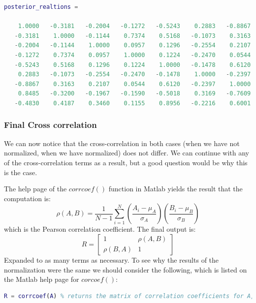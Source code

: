 \documentclass[12pt, a4paper]{article}
\begin{document}
\begin{lstlisting}[language=Matlab, label=lst:posterior, caption=The cross correlation output after normalization.]
posterior_realtions =

    1.0000   -0.3181   -0.2004   -0.1272   -0.5243    0.2883   -0.8867    0.8485   -0.4830
   -0.3181    1.0000   -0.1144    0.7374    0.5168   -0.1073    0.3163   -0.3200    0.4187
   -0.2004   -0.1144    1.0000    0.0957    0.1296   -0.2554    0.2107   -0.1967    0.3460
   -0.1272    0.7374    0.0957    1.0000    0.1224   -0.2470    0.0544   -0.1590    0.1155
   -0.5243    0.5168    0.1296    0.1224    1.0000   -0.1478    0.6120   -0.5018    0.8956
    0.2883   -0.1073   -0.2554   -0.2470   -0.1478    1.0000   -0.2397    0.3169   -0.2216
   -0.8867    0.3163    0.2107    0.0544    0.6120   -0.2397    1.0000   -0.7609    0.6001
    0.8485   -0.3200   -0.1967   -0.1590   -0.5018    0.3169   -0.7609    1.0000   -0.4549
   -0.4830    0.4187    0.3460    0.1155    0.8956   -0.2216    0.6001   -0.4549    1.0000    
\end{lstlisting}

\subsubsection{Final Cross correlation}

We can now notice that the cross-correlation in both cases (when we have not normalized, when we have normalized) does not differ. We can continue with any of the cross-correlation terms as a result, but a good question would be why this is the case.
\newline

The help page of the $corrcoef()$ function in Matlab yields the result that the computation is:
\[
\rho(A,B) = \frac{1}{N-1}\sum_{i=1}^{N}{\left(\frac{A_i-\mu_A}{\sigma_A}\right)\left(\frac{B_i-\mu_B}{\sigma_B}\right)}
\]
which is the Pearson correlation coefficient. The final output is:
\[
R=\left[\begin{matrix}
    1 & \rho(A,B) \\
    \rho(B,A) & 1
\end{matrix}\right] 
\]
Expanded to as many terms as necessary. To see why the results of the normalization were the same we should consider the following, which is listed on the Matlab help page for $corcoef()$:
\newline

\begin{lstlisting}[language=Matlab, caption=The cross correlation output after normalization.]
R = corrcoef(A) % returns the matrix of correlation coefficients for A, where the columns of A represent random variables and the rows represent observations.
\end{lstlisting}
\end{document}
